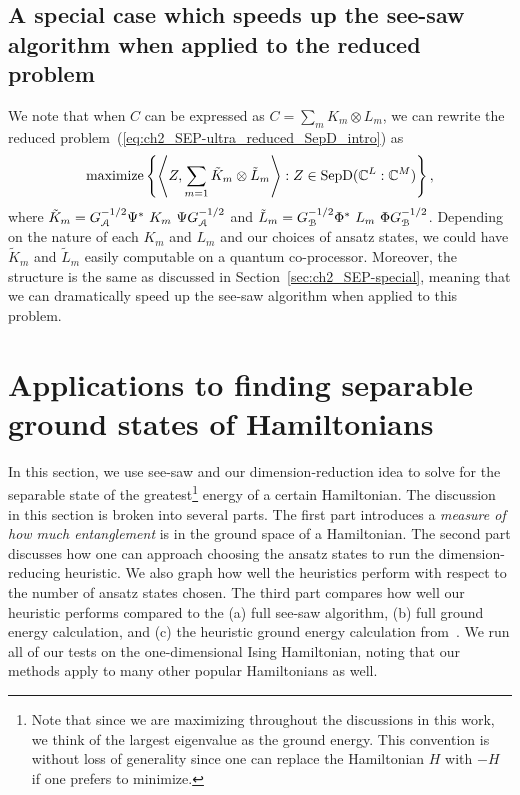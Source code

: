 
\subsection{A special case which speeds up the see-saw algorithm when applied to the reduced problem}   

We note that when $C$ can be expressed as $C = \sum_m K_m \otimes L_m$, we can rewrite the reduced problem~(\ref{eq:ch2_SEP-ultra_reduced_SepD_intro}) as
\begin{equation}
    \label{eq:ch2_SEP-ultra_reduced_SepD_KL_intro}
    \text{maximize} \left\{ \left\langle Z, \sum_{m=1} \tilde{K}_m \otimes \tilde{L}_m \right\rangle : Z \in \mathrm{SepD}(\mathbb{C}^L : \mathbb{C}^M) \right\},
\end{equation}
where 
$\tilde{K}_m = G_{\mathcal{A}}^{-1/2} \Psi^*\ K_m\ \Psi G_{\mathcal{A}}^{-1/2}$
and 
$\tilde{L}_m = G_{\mathcal{B}}^{-1/2} \Phi^*\ L_m\ \Phi G_{\mathcal{B}}^{-1/2}$.  
Depending on the nature of each $K_m$ and $L_m$ and our choices of ansatz states, we could have $\tilde{K}_m$ and $\tilde{L}_m$ easily computable on a quantum co-processor. 
Moreover, the structure is the same as discussed in Section~\ref{sec:ch2_SEP-special}, meaning that we can dramatically speed up the see-saw algorithm when applied to this problem. 

\section{Applications to finding separable ground states of Hamiltonians}\label{sec:ch2_SEP-Hammy_intro} 

In this section, we use see-saw and our dimension-reduction idea to solve for the separable state of the greatest\footnote{Note that since we are maximizing throughout the discussions in this work, we think of the largest eigenvalue as the ground energy. 
This convention is without loss of generality since one can replace the Hamiltonian $H$ with $-H$ if one prefers to minimize.} energy of a certain Hamiltonian. 
The discussion in this section is broken into several parts. 
The first part introduces a \emph{measure of how much entanglement} is in the ground space of a Hamiltonian. 
The second part discusses how one can approach choosing the ansatz states to run the dimension-reducing heuristic. 
We also graph how well the heuristics perform with respect to the number of ansatz states chosen. 
The third part compares how well our heuristic performs compared to the (a) full see-saw algorithm, (b) full ground energy calculation, and (c) the heuristic ground energy calculation from~\cite{bharti2022noisy}. 
We run all of our tests on the one-dimensional Ising Hamiltonian, noting that our methods apply to many other popular Hamiltonians as well. 

